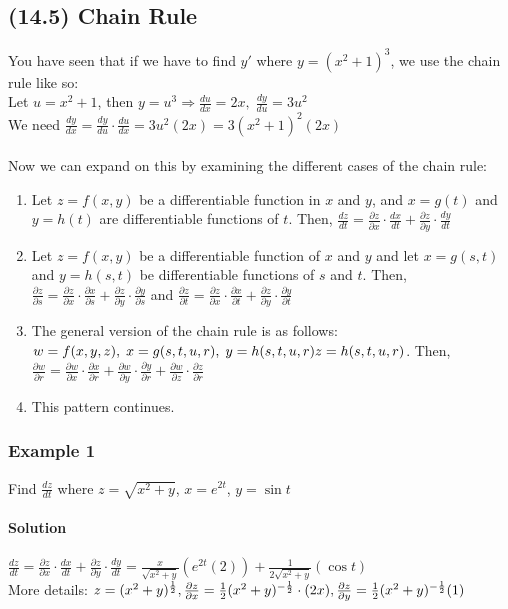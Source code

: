 \documentclass{article}
\newcommand{\p}{\partial}
\begin{document}
\subsection{(14.5) Chain Rule}
You have seen that if we have to find $y'$ where $y=(x^2+1)^3$, we use the chain rule like so:
\\Let $u=x^2+1$, then $y=u^3\Rightarrow\frac{du}{dx}=2x,\;\frac{dy}{du}=3u^2$
\\We need $\frac{dy}{dx}=\frac{dy}{du}\cdot\frac{du}{dx}=3u^2(2x)=3(x^2+1)^2(2x)$
\\\\Now we can expand on this by examining the different cases of the chain rule: \begin{enumerate}
    \itemsep 0em
    \item Let $z=f(x,y)$ be a differentiable function in $x$ and $y$, and $x=g(t)$ and $y=h(t)$ are differentiable functions of $t$.
            Then, $\frac{dz}{dt}=\frac{\p z}{\p x}\cdot\frac{dx}{dt}+\frac{\p z}{\p y}\cdot{\frac{dy}{dt}}$
    \item Let $z=f(x,y)$ be a differentiable function of $x$ and $y$ and let $x=g(s,t)$ and $y=h(s,t)$ be differentiable functions of $s$ and $t$.
            Then, $\frac{\p z}{\p s}=\frac{\p z}{\p x}\cdot\frac{\p x}{\p s}+\frac{\p z}{\p y}\cdot\frac{\p y}{\p s}$
            and $\frac{\p z}{\p t}=\frac{\p z}{\p x}\cdot\frac{\p x}{\p t}+\frac{\p z}{\p y}\cdot\frac{\p y}{\p t}$
    \item The general version of the chain rule is as follows: $w=f(x,y,z),\;x=g(s,t,u,r),\;y=h(s,t,u,r)\\z=h(s,t,u,r)$.
            Then, $\frac{\p w}{\p r}=\frac{\p w}{\p x}\cdot\frac{\p x}{\p r}+\frac{\p w}{\p y}\cdot\frac{\p y}{\p r}+\frac{\p w}{\p z}\cdot\frac{\p z}{\p r}$
    \item This pattern continues.
\end{enumerate}

\subsubsection{Example 1}
Find $\frac{dz}{dt}$ where $z=\sqrt{x^2+y}$, $x=e^{2t}$, $y=\sin{t}$
\paragraph{Solution} $\frac{dz}{dt}=\frac{\p z}{\p x}\cdot\frac{dx}{dt}+\frac{\p z}{\p y}\cdot\frac{dy}{dt}
=\frac{x}{\sqrt{x^2+y}}(e^{2t}(2))+\frac{1}{2\sqrt{x^2+y}}(\cos{t})$
\\More details: $z=(x^2+y)^{\frac{1}{2}},
\\\frac{\p z}{\p x}=\frac{1}{2}(x^2+y)^{-\frac{1}{2}}\cdot(2x),
\\\frac{\p z}{\p y}=\frac{1}{2}(x^2+y)^{-\frac{1}{2}}(1)$
\end{document}

